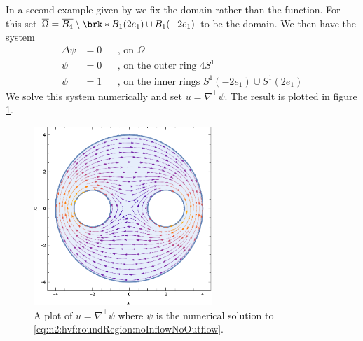 In a second example given by \cite{Wahlen2023} we fix the domain rather than the function.
For this set $\overline{\Omega}=\overline{B_4}\setminus\brk*{B_1(2e_1)\cup B_1(-2e_1)}$ to be the domain.
We then have the system
\begin{equation}
  \begin{aligned}
    \Delta \psi&=0 &&\text{, on }\Omega \\
    \psi&=0 &&\text{, on the outer ring }4S^1 \\
    \psi&=1 &&\text{, on the inner rings }S^1(-2e_1)\cup S^1(2e_1)
  \end{aligned}\label{eq:n2:hvf:roundRegion:noInflowNoOutflow}
\end{equation}
We solve this system numerically and set $u=\nabla^\perp\psi$.
The result is plotted in figure \ref{pl:n2_hvf_roundRegion_noInflowNoOutflow}.
\begin{figure}
  \centering
  \includegraphics[width=0.6\textwidth]{../Plots/HarmonicVectorFields_gr4.eps}
  \caption{A plot of $u=\nabla^\perp\psi$ where $\psi$ is the numerical solution to
   \eqref{eq:n2:hvf:roundRegion:noInflowNoOutflow}.}
  \label{pl:n2_hvf_roundRegion_noInflowNoOutflow}
\end{figure}

